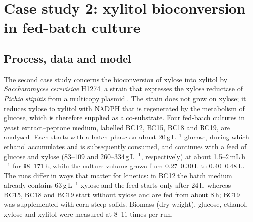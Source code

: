 \section{Case study 2: xylitol bioconversion in fed-batch culture}\label{sec:case2}

\subsection{Process, data and model}\label{sec:c2:system}
The second case study concerns the bioconversion of xylose into xylitol by \emph{Saccharomyces cerevisiae} H1274, a strain that expresses the xylose reductase of \emph{Pichia stipitis} from a multicopy plasmid \citep{Toivari2025,ToivariData2025}. The strain does not grow on xylose; it reduces xylose to xylitol with NADPH that is regenerated by the metabolism of glucose, which is therefore supplied as a co-substrate. Four fed-batch cultures in yeast extract--peptone medium, labelled BC12, BC15, BC18 and BC19, are analysed. Each starts with a batch phase on about 20\,g\,L$^{-1}$ glucose, during which ethanol accumulates and is subsequently consumed, and continues with a feed of glucose and xylose (83--109 and 260--334\,g\,L$^{-1}$, respectively) at about 1.5--2\,mL\,h$^{-1}$ for 98--171\,h, while the culture volume grows from 0.27--0.30\,L to 0.40--0.48\,L. The runs differ in ways that matter for kinetics: in BC12 the batch medium already contains 63\,g\,L$^{-1}$ xylose and the feed starts only after 24\,h, whereas BC15, BC18 and BC19 start without xylose and are fed from about 8\,h; BC19 was supplemented with corn steep solids. Biomass (dry weight), glucose, ethanol, xylose and xylitol were measured at 8--11 times per run.

